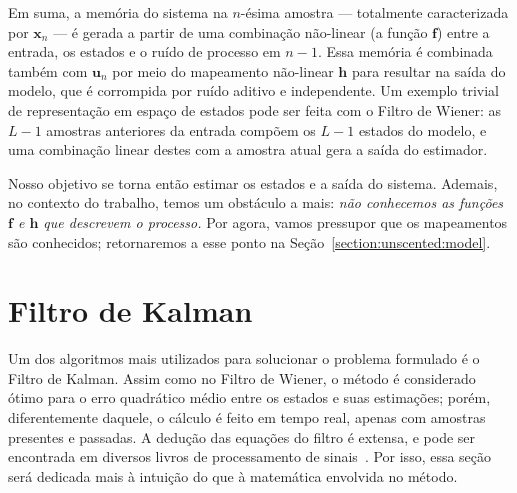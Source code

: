 Em suma, a memória do sistema na $n$-ésima amostra --- totalmente caracterizada por
$\mathbf{x}_n$ --- é gerada a partir de uma combinação não-linear (a função
$\mathbf{f}$) entre a entrada, os estados e o ruído de processo em $n-1$. Essa memória
é combinada também com $\mathbf{u}_n$ por meio do mapeamento não-linear $\mathbf{h}$
para resultar na saída do modelo, que é corrompida por ruído aditivo e independente. Um
exemplo trivial de representação em espaço de estados pode ser feita com o Filtro de
Wiener: as $L - 1$ amostras anteriores da entrada compõem os $L - 1$ estados do modelo,
e uma combinação linear destes com a amostra atual gera a saída do estimador.

Nosso objetivo se torna então estimar os estados e a saída do sistema. Ademais, no
contexto do trabalho, temos um obstáculo a mais: \emph{não conhecemos as funções
	$\mathbf{f}$ e $\mathbf{h}$ que descrevem o processo.} Por agora, vamos pressupor que
os mapeamentos são conhecidos; retornaremos a esse ponto na
Seção~\ref{section:unscented:model}.

\section{Filtro de Kalman}

Um dos algoritmos mais utilizados para solucionar o problema formulado é o Filtro de
Kalman. Assim como no Filtro de Wiener, o método é considerado ótimo para o erro
quadrático médio entre os estados e suas estimações; porém, diferentemente daquele, o
cálculo é feito em tempo real, apenas com amostras presentes e passadas. A dedução das
equações do filtro é extensa, e pode ser encontrada em diversos livros de processamento
de sinais~\cite{diniz-2020, hayes-1996}. Por isso, essa seção será dedicada mais à
intuição do que à matemática envolvida no método.

